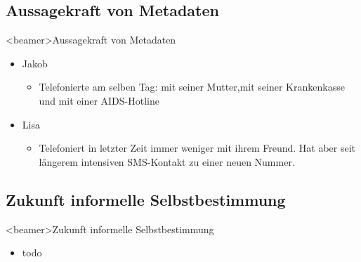       \subsection*{Aussagekraft von Metadaten}
    \begin{frame}<beamer>{Aussagekraft von Metadaten}
      \begin{itemize}
        \item Jakob
           \begin{itemize}
         \item Telefonierte am selben Tag: mit seiner Mutter,mit seiner Krankenkasse und mit einer AIDS-Hotline
      \end{itemize}
        \item Lisa
           \begin{itemize}
         \item Telefoniert in letzter Zeit immer weniger mit ihrem Freund. Hat aber seit längerem intensiven SMS-Kontakt zu einer neuen Nummer.
      \end{itemize}
      \end{itemize}
    \end{frame}
    
    
    

  \subsection*{Zukunft informelle Selbstbestimmung}
    \begin{frame}<beamer>{Zukunft informelle Selbstbestimmung}
      \begin{itemize}
        \item
          todo
  

      \end{itemize}
    \end{frame}

